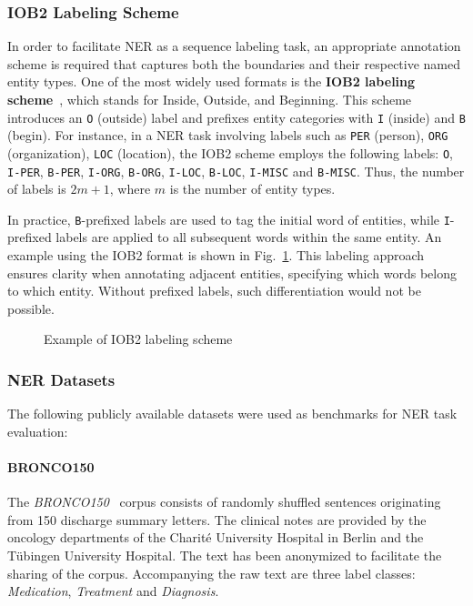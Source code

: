 \subsubsection{IOB2 Labeling Scheme}
In order to facilitate NER as a sequence labeling task, an appropriate
annotation scheme is required that captures both the boundaries and their
respective named entity types. One of the most widely used formats is the
\textbf{IOB2 labeling scheme}~\cite{ramshaw1999text}, which stands for Inside,
Outside, and Beginning. This scheme introduces an \texttt{O} (outside) label and
prefixes entity categories with \texttt{I} (inside) and \texttt{B} (begin). For
instance, in a NER task involving labels such as \texttt{PER} (person),
\texttt{ORG} (organization), \texttt{LOC} (location), the IOB2 scheme employs
the following labels: \texttt{O}, \texttt{I-PER}, \texttt{B-PER},
\texttt{I-ORG}, \texttt{B-ORG}, \texttt{I-LOC}, \texttt{B-LOC}, \texttt{I-MISC}
and \texttt{B-MISC}. Thus, the number of labels is $2m + 1$, where $m$ is the
number of entity types.

In practice, \texttt{B}-prefixed labels are used to tag the initial word of
entities, while \texttt{I}-prefixed labels are applied to all subsequent words
within the same entity. An example using the IOB2 format is shown in
Fig.~\ref{fig:iob2}. This labeling approach ensures clarity when annotating
adjacent entities, specifying which words belong to which entity. Without
prefixed labels, such differentiation would not be possible.

\begin{figure}[htbp]
    \centering
    
    \caption{Example of IOB2 labeling scheme}
    \label{fig:iob2}
\end{figure}

\subsubsection{NER Datasets}
The following publicly available datasets were used as benchmarks for NER task
evaluation:

\paragraph{BRONCO150}
The \textit{BRONCO150}~\cite{kittner2021bronco150} corpus consists of randomly
shuffled sentences originating from 150 discharge summary letters. The clinical
notes are provided by the oncology departments of the Charité University
Hospital in Berlin and the Tübingen University Hospital. The text has been
anonymized to facilitate the sharing of the corpus. Accompanying the raw text
are three label classes: \textit{Medication}, \textit{Treatment} and
\textit{Diagnosis}.

